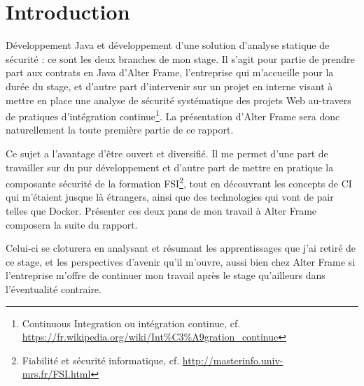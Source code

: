 \section{Introduction}
Développement Java et développement d'une solution d'analyse statique de sécurité : ce sont les deux branches de mon stage. Il s'agit pour partie de prendre part aux contrats en Java d'Alter Frame, l'entreprise qui m'accueille pour la durée du stage, et d'autre part d'intervenir sur un projet en interne visant à mettre en place une analyse de sécurité systématique des projets Web au-travers de pratiques d'intégration continue\footnote{Continuous Integration ou intégration continue, cf. \url{https://fr.wikipedia.org/wiki/Int\%C3\%A9gration_continue}}. La présentation d'Alter Frame sera donc naturellement la toute première partie de ce rapport. 

Ce sujet a l'avantage d'être ouvert et diversifié. Il me permet d'une part de travailler sur du pur développement et d'autre part de mettre en pratique la composante sécurité de la formation FSI\footnote{Fiabilité et sécurité informatique, cf. \url{http://masterinfo.univ-mrs.fr/FSI.html}}, tout en découvrant les concepts de CI qui m'étaient jusque là étrangers, ainsi que des technologies qui vont de pair telles que Docker. Présenter ces deux pans de mon travail à Alter Frame composera la suite du rapport.

Celui-ci se cloturera en analysant et résumant les apprentissages que j'ai retiré de ce stage, et les perspectives d'avenir qu'il m'ouvre, aussi bien chez Alter Frame si l'entreprise m'offre de continuer mon travail après le stage qu'ailleurs dans l'éventualité contraire. 
